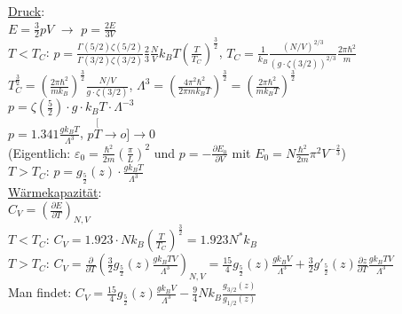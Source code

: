 \begin{tabbing}
\underline{Druck}:\\
$E = \frac{3}{2} p V$ $\rightarrow$ $p = \frac{2 E}{3 V}$\\
$T < T_C$:\> $p = \frac{\Gamma(5/2)\zeta(5/2)}{\Gamma(3/2)\zeta(3/2)}\frac{2}{3}\frac{N}{V} k_B T \left(\frac{T}{T_C}\right)^{\frac{3}{2}}$, $T_C = \frac{1}{k_B}\frac{(N/V)^{2/3}}{(g\cdot \zeta(3/2))^{2/3}}\frac{2\pi \hbar^2}{m}$\\
\> $T_C^{\frac{3}{2}} = \left(\frac{2\pi\hbar^2}{m k_B}\right)^{\frac{3}{2}}\frac{N/V}{g\cdot \zeta(3/2)}$,
$\Lambda^3 = \left(\frac{4\pi^2\hbar^2}{2\pi m k_B T}\right)^{\frac{3}{2}} = \left(\frac{2\pi\hbar^2}{m k_B T}\right)^{\frac{3}{2}}$\\
\> $p = \zeta\left(\frac{5}{2}\right)\cdot g\cdot k_B T\cdot \Lambda^{-3}$\\
\> $p = 1.341 \frac{g k_B T}{\Lambda^3}$, $p \stackrel[T\to o]{}{\longrightarrow}0$\\
\> (Eigentlich: $\varepsilon_0 = \frac{\hbar^2}{2 m}\left(\frac{\pi}{L}\right)^2$ und $p = -\frac{\partial E_0}{\partial V}$ mit $E_0 = N \frac{\hbar^2}{2 m} \pi^2 V^{-\frac{2}{3}}$)\\
$T > T_C$:\> $p = g_{\frac{5}{2}}(z)\cdot \frac{g k_B T}{\Lambda^3}$\\
\underline{Wärmekapazität}:\\
$C_V = \left(\frac{\partial E}{\partial T}\right)_{N,V}$\\
$T < T_C$:\> $C_V = 1.923\cdot N k_B \left(\frac{T}{T_C}\right)^{\frac{3}{2}} = 1.923 N^{*} k_B$\\
$T > T_C$:\> $C_V = \frac{\partial}{\partial T}\left(\frac{3}{2}g_{\frac{5}{2}}(z)\frac{g k_B T V}{\Lambda^3}\right)_{N,V} = \frac{15}{4}g_{\frac{5}{2}}(z)\frac{g k_B V}{\Lambda^3} + \frac{3}{2}g'_{\frac{5}{2}}(z)\frac{\partial z}{\partial T}\frac{g k_B T V}{\Lambda^3}$\\
\> Man findet: $C_V = \frac{15}{4} g_{\frac{5}{2}}(z)\frac{g k_B V}{\Lambda^3} - \frac{9}{4} N k_B \frac{g_{3/2}(z)}{g_{1/2}(z)}$\\
\end{tabbing}
\begin{figure}[H]
  \centering
\end{figure}
